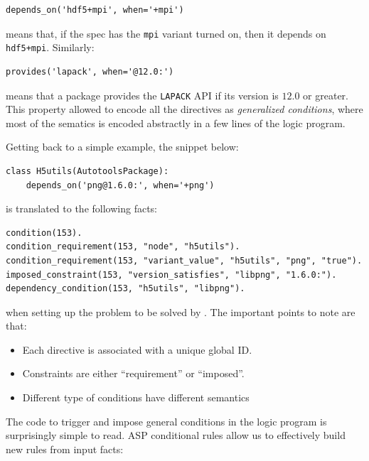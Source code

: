 \begin{verbatim}
depends_on('hdf5+mpi', when='+mpi')
\end{verbatim}

means that, if the spec has the \texttt{mpi} variant turned on, then it depends on \texttt{hdf5+mpi}. Similarly:

\begin{verbatim}
provides('lapack', when='@12.0:')
\end{verbatim}

means that a package provides the \texttt{LAPACK} API if its version is $12.0$ or greater.
This property allowed to encode all the directives as \emph{generalized conditions}, where most of the sematics is encoded abstractly in a few lines of the logic program.

Getting back to a simple example, the snippet below:

\begin{verbatim}
class H5utils(AutotoolsPackage):
    depends_on('png@1.6.0:', when='+png')
\end{verbatim}

is translated to the following facts:

\begin{verbatim}
condition(153).
condition_requirement(153, "node", "h5utils").
condition_requirement(153, "variant_value", "h5utils", "png", "true").
imposed_constraint(153, "version_satisfies", "libpng", "1.6.0:").
dependency_condition(153, "h5utils", "libpng").
\end{verbatim}

when setting up the problem to be solved by \clingo. The important points to note are that:

\begin{itemize}
\item Each directive is associated with a unique global ID.
\item Constraints are either ``requirement'' or ``imposed''.
\item Different type of conditions have different semantics\footnotemark
\end{itemize}
The code to trigger and impose general conditions in the logic program is surprisingly simple to read. ASP conditional rules allow us to effectively build new rules from input facts:

